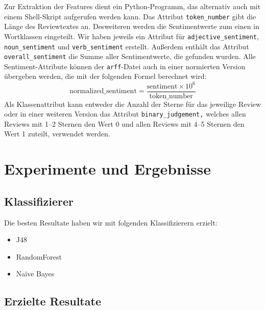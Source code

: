 \documentclass[a4paper]{article}
\newcommand{\ourextension}[1]{\texttt{#1}}
\begin{document}
Zur Extraktion der Features dient ein Python-Programm, das alternativ auch mit einem Shell-Skript aufgerufen werden kann.\newline 
Das Attribut \texttt{token\_number} gibt die Länge des Reviewtextes an. Desweiteren werden die Sentimentwerte zum einen in Wortklassen eingeteilt. Wir haben jeweils ein Attribut für \texttt{adjective\_sentiment}, \texttt{noun\_sentiment} und \texttt{verb\_sentiment} erstellt. Außerdem enthält das Attribut \texttt{overall\_sentiment} die Summe aller Sentimentwerte, die gefunden wurden.\newline
Alle Sentiment-Attribute können der \ourextension{arff}-Datei auch in einer normierten Version übergeben werden, die mit der folgenden Formel berechnet wird:
$$\text{normalized\_sentiment} = \frac{\text{sentiment} \times 10^6}{\text{token\_number}}$$
Als Klassenattribut kann entweder die Anzahl der Sterne für das jeweilige Review oder in einer weiteren Version das Attribut \texttt{binary\_judgement,} welches allen Reviews mit 1--2 Sternen den Wert 0 und allen Reviews mit 4--5 Sternen den Wert 1 zuteilt, verwendet werden.


\section{Experimente und Ergebnisse}


\subsection{Klassifizierer}

Die besten Resultate haben wir mit folgenden Klassifizierern erzielt:
\begin{itemize}
	\item J48 
	\item RandomForest
	\item Naïve Bayes
\end{itemize}



\subsection{Erzielte Resultate}
\end{document}

